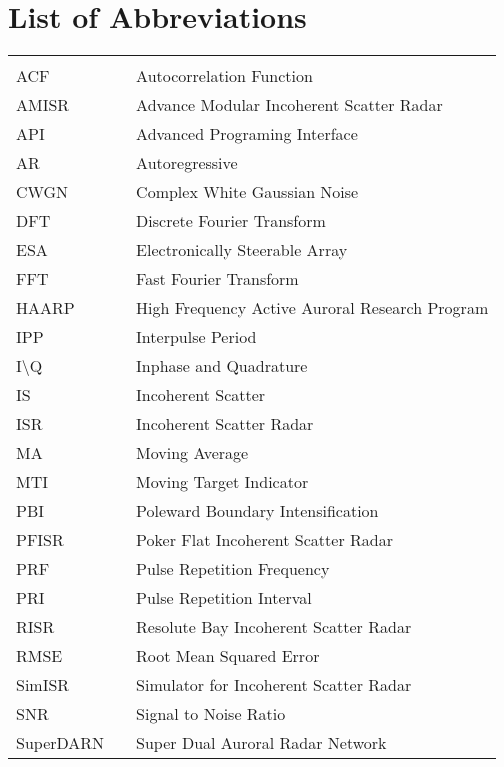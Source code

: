 \chapter*{List of Abbreviations}
\begin{center}
  \begin{tabular}{lll}
    \hspace*{2em} & \hspace*{1in} & \hspace*{4.5in} \\
    ACF & \dotfill & Autocorrelation Function\\
    AMISR  & \dotfill & Advance Modular Incoherent Scatter Radar \\
    API & \dotfill & Advanced Programing Interface\\
    AR & \dotfill & Autoregressive\\
    CWGN & \dotfill & Complex White Gaussian Noise\\
    DFT & \dotfill & Discrete Fourier Transform \\
    ESA  & \dotfill & Electronically Steerable Array \\
    FFT & \dotfill & Fast Fourier Transform \\
    HAARP & \dotfill & High Frequency Active Auroral Research Program\\
    IPP & \dotfill & Interpulse Period\\
    I\textbackslash Q & \dotfill & Inphase and Quadrature\\
    IS & \dotfill & Incoherent Scatter\\
    ISR  & \dotfill & Incoherent Scatter Radar \\
    MA & \dotfill & Moving Average\\
    MTI & \dotfill & Moving Target Indicator \\
    PBI & \dotfill & Poleward Boundary Intensification \\
    PFISR & \dotfill & Poker Flat Incoherent Scatter Radar\\
    PRF & \dotfill & Pulse Repetition Frequency \\
    PRI & \dotfill & Pulse Repetition Interval\\
    RISR & \dotfill & Resolute Bay Incoherent Scatter Radar\\
    RMSE & \dotfill & Root Mean Squared Error\\
    SimISR & \dotfill & Simulator for Incoherent Scatter Radar \\
    SNR & \dotfill & Signal to Noise Ratio\\
    SuperDARN & \dotfill & Super Dual Auroral Radar Network\
    
   \end{tabular}
\end{center}
\cleardoublepage


\newpage
\endofprelim
